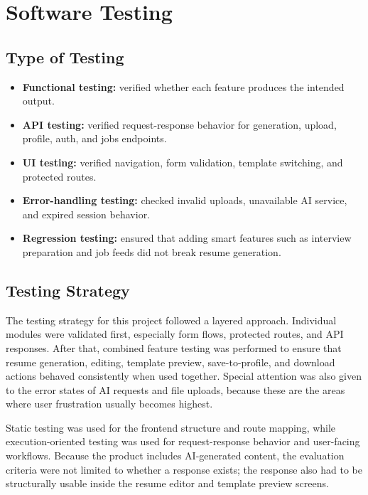 \section{Software Testing}
\subsection{Type of Testing}
\begin{itemize}
\item \textbf{Functional testing:} verified whether each feature produces the intended output.
\item \textbf{API testing:} verified request-response behavior for generation, upload, profile, auth, and jobs endpoints.
\item \textbf{UI testing:} verified navigation, form validation, template switching, and protected routes.
\item \textbf{Error-handling testing:} checked invalid uploads, unavailable AI service, and expired session behavior.
\item \textbf{Regression testing:} ensured that adding smart features such as interview preparation and job feeds did not break resume generation.
\end{itemize}

\subsection{Testing Strategy}
\noindent The testing strategy for this project followed a layered approach. Individual modules were validated first, especially form flows, protected routes, and API responses. After that, combined feature testing was performed to ensure that resume generation, editing, template preview, save-to-profile, and download actions behaved consistently when used together. Special attention was also given to the error states of AI requests and file uploads, because these are the areas where user frustration usually becomes highest.

\noindent Static testing was used for the frontend structure and route mapping, while execution-oriented testing was used for request-response behavior and user-facing workflows. Because the product includes AI-generated content, the evaluation criteria were not limited to whether a response exists; the response also had to be structurally usable inside the resume editor and template preview screens.

